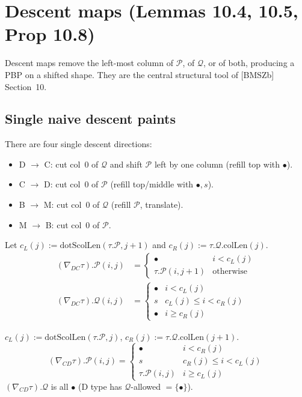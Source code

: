 \chapter{Descent maps (Lemmas 10.4, 10.5, Prop 10.8)}
\label{chap:descent}

Descent maps remove the left-most column of $\mathcal{P}$, of $\mathcal{Q}$, or
of both, producing a PBP on a shifted shape. They are the central structural
tool of [BMSZb] Section~10.

\section{Single naive descent paints}

There are four single descent directions:
\begin{itemize}
\item D $\to$ C: cut col~0 of $\mathcal{Q}$ and shift $\mathcal{P}$ left by one column (refill top with $\bullet$).
\item C $\to$ D: cut col~0 of $\mathcal{P}$ (refill top/middle with $\bullet, s$).
\item B $\to$ M: cut col~0 of $\mathcal{Q}$ (refill $\mathcal{P}$, translate).
\item M $\to$ B: cut col~0 of $\mathcal{P}$.
\end{itemize}

\begin{definition}[D $\to$ C paints]
  \label{def:descentPaint_DC}
  \leanok
  Let $c_L(j) := \mathrm{dotScolLen}(\tau.\mathcal{P}, j + 1)$ and $c_R(j) := \tau.\mathcal{Q}.\mathrm{colLen}(j)$.
  \begin{align*}
    (\nabla_{DC}\tau).\mathcal{P}(i, j) &= \begin{cases} \bullet & i < c_L(j) \\ \tau.\mathcal{P}(i, j + 1) & \text{otherwise} \end{cases} \\
    (\nabla_{DC}\tau).\mathcal{Q}(i, j) &= \begin{cases} \bullet & i < c_L(j) \\ s & c_L(j) \leq i < c_R(j) \\ \bullet & i \geq c_R(j) \end{cases}
  \end{align*}
\end{definition}

\begin{definition}[C $\to$ D paints]
  \label{def:descentPaint_CD}
  \leanok
  $c_L(j) := \mathrm{dotScolLen}(\tau.\mathcal{P}, j)$, $c_R(j) := \tau.\mathcal{Q}.\mathrm{colLen}(j + 1)$.
  \[
    (\nabla_{CD}\tau).\mathcal{P}(i, j) = \begin{cases} \bullet & i < c_R(j) \\ s & c_R(j) \leq i < c_L(j) \\ \tau.\mathcal{P}(i, j) & i \geq c_L(j) \end{cases}
  \]
  $(\nabla_{CD}\tau).\mathcal{Q}$ is all $\bullet$ (D type has $\mathcal{Q}$-allowed $= \{\bullet\}$).
\end{definition}

